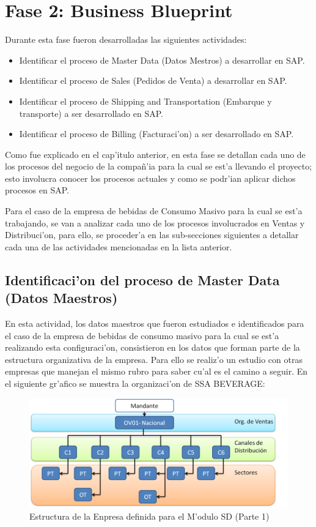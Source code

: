 \section{Fase 2: Business Blueprint}
	Durante esta fase fueron desarrolladas las siguientes actividades:
\begin{itemize}
\item Identificar el proceso de Master Data (Datos Mestros) a desarrollar en SAP.
\item Identificar el proceso de Sales (Pedidos de Venta) a desarrollar en SAP.
\item Identificar el proceso de Shipping and Transportation (Embarque y transporte) a ser desarrollado en SAP.
\item Identificar el proceso de Billing (Facturaci'on) a ser desarrollado en SAP.
\end{itemize}

	Como fue explicado en el cap'itulo anterior, en esta fase se detallan cada uno de los procesos del negocio de la compa\~n'ia para la cual se est'a llevando el proyecto; esto involucra conocer los procesos actuales y como se podr'ian aplicar dichos procesos en SAP. 
	
	Para el caso de la empresa de bebidas de Consumo Masivo para la cual se est'a trabajando, se van a analizar cada uno de los procesos involucrados en Ventas y Distribuci'on, para ello, se proceder'a en las sub-secciones siguientes a detallar cada una de las actividades mencionadas en la lista anterior.
	
\subsection{Identificaci'on del proceso de Master Data (Datos Maestros)}
	En esta actividad, los datos maestros que fueron estudiados e identificados para el caso de la empresa de bebidas de consumo masivo para la cual se est'a realizando esta configuraci'on, consistieron en los datos que forman parte de la estructura organizativa de la empresa. Para ello se realiz'o un estudio con otras empresas que manejan el mismo rubro para saber cu'al es el camino a seguir. En el siguiente gr'afico se muestra la organizaci'on de SSA BEVERAGE:
\begin{figure}[htb]
\centering
\includegraphics[scale=0.45,type=png,ext=.png,read=.png]{figures/Org1}
\caption{Estructura de la Enpresa definida para el M'odulo SD (Parte 1)}
\label{fig:estructura}
\end{figure}

